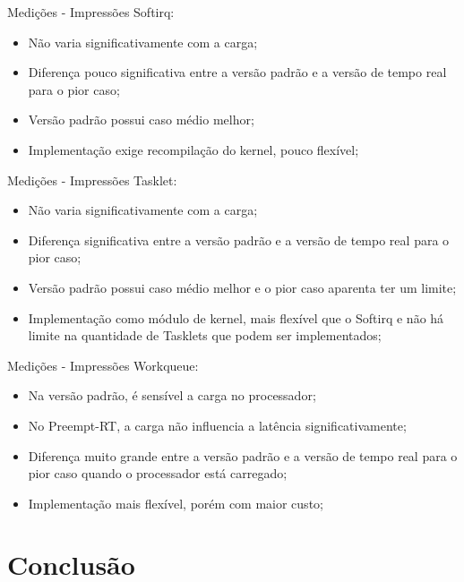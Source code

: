 \documentclass[12pt,brazil]{beamer}
\begin{document}
\begin{frame}{Medições - Impressões}
    Softirq:
    \begin{itemize}
        \item Não varia significativamente com a carga;
        \item Diferença pouco significativa entre a versão padrão e a versão de tempo real para o pior caso;
        \item Versão padrão possui caso médio melhor;
        \item Implementação exige recompilação do kernel, pouco flexível;
    \end{itemize}
\end{frame}

\begin{frame}{Medições - Impressões}
    Tasklet:
    \begin{itemize}
        \item Não varia significativamente com a carga;
        \item Diferença significativa entre a versão padrão e a versão de tempo real para o pior caso;
        \item Versão padrão possui caso médio melhor e o pior caso aparenta ter um limite;
        \item Implementação como módulo de kernel, mais flexível que o Softirq e não há limite na quantidade de Tasklets que podem ser implementados;
    \end{itemize}
\end{frame}

\begin{frame}{Medições - Impressões}
    Workqueue:
    \begin{itemize}
        \item Na versão padrão, é sensível a carga no processador;
        \item No Preempt-RT, a carga não influencia a latência significativamente;
        \item Diferença muito grande entre a versão padrão e a versão de tempo real para o pior caso quando o processador está carregado;
        \item Implementação mais flexível, porém com maior custo;
    \end{itemize}
\end{frame}

\section{Conclusão}
\end{document}

